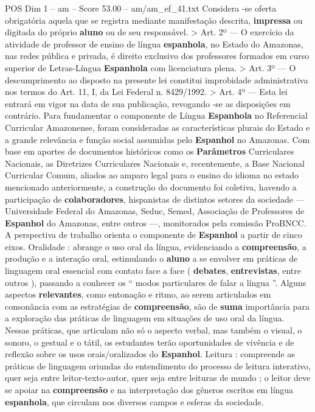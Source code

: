 \begin{textsample}{POS Dim 1 – am – Score 53.00 – am/am\_ef\_41.txt}
Considera -se oferta obrigatória aquela que se registra mediante manifestação descrita, \textbf{impressa} ou digitada do próprio \textbf{aluno} ou de seu responsável. > Art. 2º — O exercício da atividade de professor de ensino de língua \textbf{espanhola}, no Estado do Amazonas, nas redes pública e privada, é direito exclusivo dos professores formados em curso superior de Letras-Língua \textbf{Espanhola} com licenciatura plena. > Art. 3º — O descumprimento ao disposto na presente lei constitui improbidade administrativa nos termos do Art. 11, I, da Lei Federal n. 8429/1992. > Art. 4º — Esta lei entrará em vigor na data de sua publicação, revogando -se as disposições em contrário.
Para fundamentar o componente de Língua \textbf{Espanhola} no Referencial Curricular Amazonense, foram consideradas as características plurais do Estado e a grande relevância e função social assumidas pelo \textbf{Espanhol} no Amazonas.
Com base em aportes de documentos históricos como os \textbf{Parâmetros} Curriculares Nacionais, as Diretrizes Curriculares Nacionais e, recentemente, a Base Nacional Curricular Comum, aliados ao amparo legal para o ensino do idioma no estado mencionado anteriormente, a construção do documento foi coletiva, havendo a participação de \textbf{colaboradores}, hispanistas de distintos setores da sociedade — Universidade Federal do Amazonas, Seduc, Semed, Associação de Professores de \textbf{Espanhol} do Amazonas, entre outros —, monitorados pela comissão ProBNCC.
A perspectiva de trabalho orienta o componente de \textbf{Espanhol} a partir de cinco eixos.
Oralidade : abrange o uso oral da língua, evidenciando a \textbf{compreensão}, a produção e a interação oral, estimulando o \textbf{aluno} a se envolver em práticas de linguagem oral essencial com contato face a face ( \textbf{debates}, \textbf{entrevistas}, entre outros ), passando a conhecer os “ modos particulares de falar a língua ”.
Alguns aspectos \textbf{relevantes}, como entonação e ritmo, ao serem articulados em consonância com as estratégias de \textbf{compreensão}, são de \textbf{suma} importância para a exploração das práticas de linguagem em situações de uso oral da língua.
Nessas práticas, que articulam não só o aspecto verbal, mas também o visual, o sonoro, o gestual e o tátil, os estudantes terão oportunidades de vivência e de reflexão sobre os usos orais/oralizados do \textbf{Espanhol}.
Leitura : compreende as práticas de linguagem oriundas do entendimento do processo de leitura interativo, quer seja entre leitor-texto-autor, quer seja entre leituras de mundo ; o leitor deve se apoiar na \textbf{compreensão} e na interpretação dos gêneros escritos em língua \textbf{espanhola}, que circulam nos diversos campos e esferas da sociedade.

\end{textsample}
